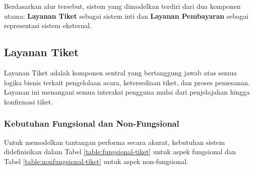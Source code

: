 Berdasarkan alur tersebut, sistem yang dimodelkan terdiri dari dua komponen utama: \textbf{Layanan Tiket} sebagai sistem inti dan \textbf{Layanan Pembayaran} sebagai representasi sistem eksternal.

\subsection{Layanan Tiket}

Layanan Tiket adalah komponen sentral yang bertanggung jawab atas semua logika bisnis terkait pengelolaan acara, ketersediaan tiket, dan proses pemesanan. Layanan ini menangani semua interaksi pengguna mulai dari penjelajahan hingga konfirmasi tiket.

\subsubsection{Kebutuhan Fungsional dan Non-Fungsional}

Untuk memodelkan tantangan performa secara akurat, kebutuhan sistem didefinisikan dalam Tabel \ref{table:fungsional-tiket} untuk aspek fungsional dan Tabel \ref{table:nonfungsional-tiket} untuk aspek non-fungsional.

\pagebreak

